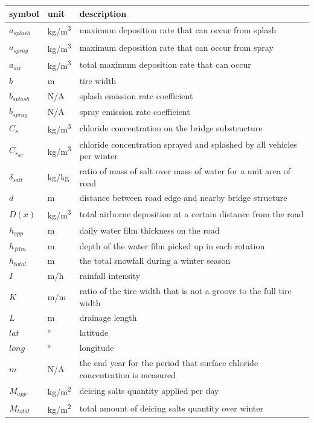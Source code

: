 \documentclass[12pt]{article}
\begin{document}
\renewcommand{\arraystretch}{1.2}
\noindent \begin{longtable*}{l l p{12cm}} \toprule
\textbf{symbol} & \textbf{unit} & \textbf{description}\\
\midrule 
$a_{splash}$ & \si{kg/m^3} & maximum deposition rate that can occur from splash\\
$a_{spray}$ & \si{kg/m^3} & maximum deposition rate that can occur from spray\\
$a_{air}$ & \si{kg/m^3} & total maximum deposition rate that can occur\\
$b$ & \si{m} & tire width\\
$b_{splash}$ & N/A & splash emission rate coefficient\\
$b_{spray}$ & N/A & spray emission rate coefficient\\
$C_s$ & \si{kg/m^3} & chloride concentration on the bridge substructure\\
$C_{s_{air}}$ & \si{kg/m^3} & chloride concentration sprayed and splashed by all vehicles per winter\\
$\delta_{salt}$ & kg/kg & ratio of mass of salt over mass of water for a unit area of road\\
$d$ & \si{m} & distance between road edge and nearby bridge structure\\
$D(x)$ & \si{kg/m^3} & total airborne deposition at a certain distance from the road\\
$h_{app}$ & \si{m} & daily water film thickness on the road\\
$h_{film}$ & \si{m} & depth of the water film picked up in each rotation\\
$h_{total}$ & \si{m} & the total snowfall during a winter season\\
$I$ & \si{m/h} & rainfall intensity\\
$K$ & m/m & ratio of the tire width that is not a groove to the full tire width\\
$L$ & \si{m} & drainage length\\
$lat$ & \si{\degree} & latitude\\
$long$ & \si{\degree} & longitude\\
$m$ & N/A & the end year for the period that surface chloride concentration is measured\\
$M_{app}$ & \si{kg/m^2} & deicing salts quantity applied per day\\
$M_{total}$ & \si{kg/m^2} & total amount of deicing salts quantity over winter\\

\end{longtable*}
\end{document}
